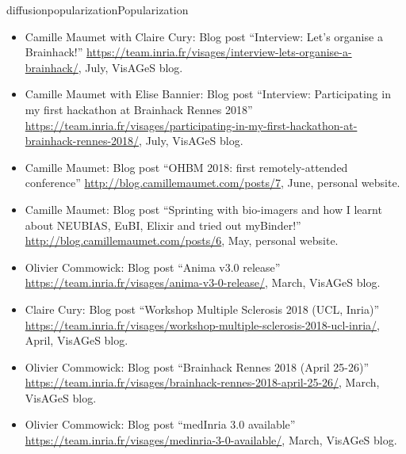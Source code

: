 \documentclass{ra2018}
\begin{document}
\begin{module}{diffusion}{popularization}{Popularization}
\begin{itemize}
   \item Camille Maumet with Claire Cury: Blog post ``Interview: Let’s organise a Brainhack!'' \url{https://team.inria.fr/visages/interview-lets-organise-a-brainhack/}, July, VisAGeS blog.
   \item Camille Maumet with Elise Bannier: Blog post ``Interview: Participating in my first hackathon at Brainhack Rennes 2018'' \url{https://team.inria.fr/visages/participating-in-my-first-hackathon-at-brainhack-rennes-2018/}, July, VisAGeS blog.
   \item Camille Maumet: Blog post ``OHBM 2018: first remotely-attended conference'' \url{http://blog.camillemaumet.com/posts/7}, June, personal website.
   \item Camille Maumet: Blog post ``Sprinting with bio-imagers and how I learnt about NEUBIAS, EuBI, Elixir and tried out myBinder!'' \url{http://blog.camillemaumet.com/posts/6}, May, personal website. 
   \item Olivier Commowick: Blog post ``Anima v3.0 release'' \url{https://team.inria.fr/visages/anima-v3-0-release/}, March, VisAGeS blog.
   \item Claire Cury: Blog post ``Workshop Multiple Sclerosis 2018 (UCL, Inria)'' \url{https://team.inria.fr/visages/workshop-multiple-sclerosis-2018-ucl-inria/}, April, VisAGeS blog.
   \item Olivier Commowick: Blog post ``Brainhack Rennes 2018 (April 25-26)'' \url{https://team.inria.fr/visages/brainhack-rennes-2018-april-25-26/}, March, VisAGeS blog.
   \item Olivier Commowick: Blog post ``medInria 3.0 available'' \url{https://team.inria.fr/visages/medinria-3-0-available/}, March, VisAGeS blog.
 \end{itemize}


\end{module}
\end{document}
